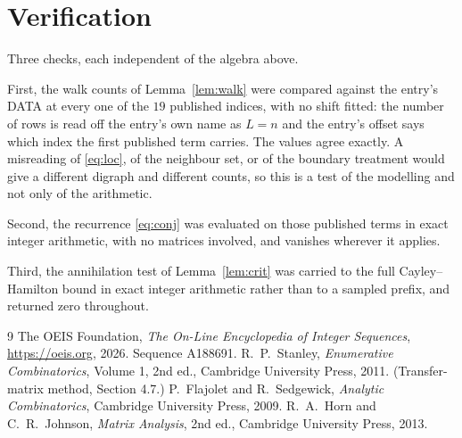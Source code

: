 \documentclass[11pt,a4paper]{article}
\theoremstyle{plain}
\theoremstyle{definition}
\begin{document}
\section{Verification}

Three checks, each independent of the algebra above.

First, the walk counts of Lemma~\ref{lem:walk} were compared against the entry's DATA at
every one of the $19$ published indices, with no shift fitted: the number of rows is
read off the entry's own name as $L=n$ and the entry's offset says which index the first
published term carries. The values agree exactly. A misreading of \eqref{eq:loc}, of the
neighbour set, or of the boundary treatment would give a different digraph and different
counts, so this is a test of the modelling and not only of the arithmetic.

Second, the recurrence \eqref{eq:conj} was evaluated on those published terms in exact
integer arithmetic, with no matrices involved, and vanishes wherever it applies.

Third, the annihilation test of Lemma~\ref{lem:crit} was carried to the full
Cayley--Hamilton bound in exact integer arithmetic rather than to a sampled prefix, and
returned zero throughout.

\begin{thebibliography}{9}
 The OEIS Foundation, \emph{The On-Line Encyclopedia of Integer
Sequences}, \url{https://oeis.org}, 2026. Sequence A188691.
 R.~P.~Stanley, \emph{Enumerative Combinatorics}, Volume 1, 2nd ed.,
Cambridge University Press, 2011. (Transfer-matrix method, Section 4.7.)
 P.~Flajolet and R.~Sedgewick, \emph{Analytic Combinatorics}, Cambridge
University Press, 2009.
 R.~A.~Horn and C.~R.~Johnson, \emph{Matrix Analysis}, 2nd ed., Cambridge
University Press, 2013.
\end{thebibliography}
\end{document}
